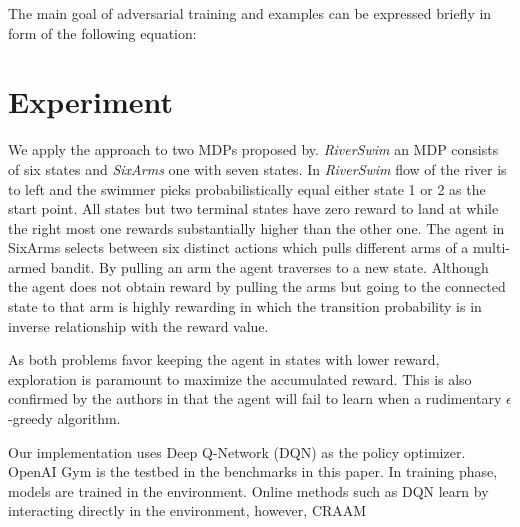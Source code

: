 \documentclass{article}
\begin{document}
    The main goal of adversarial training and examples can be expressed briefly in form of the following equation:


    \section{Experiment}
    We apply the approach to two MDPs proposed by\cite{Strehl2004}. \textit{RiverSwim} an MDP consists of six states and \textit{SixArms} one with seven states. In \textit{RiverSwim} flow of the river is to left and the swimmer picks probabilistically equal either state 1 or 2 as the start point. All states but two terminal states have zero reward to land at while the right most one rewards substantially higher than the other one. The agent in SixArms selects between six distinct actions which pulls different arms of a multi-armed bandit. By pulling an arm the agent traverses to a new state. Although the agent does not obtain reward by pulling the arms but going to the connected state to that arm is highly rewarding in which the transition probability is in inverse relationship with the reward value.

    As both problems favor keeping the agent in states with lower reward, exploration is paramount to maximize the accumulated reward. This is also confirmed by the authors in \cite{Strehl2004} that the agent will fail to learn when a rudimentary $\epsilon$-greedy algorithm.

    Our implementation uses Deep Q-Network (DQN)\cite{Mnih2015} as the policy optimizer. OpenAI Gym \cite{Brockman2016} is the testbed in the benchmarks in this paper. In training phase, models are trained in the environment. Online methods such as DQN learn by interacting directly in the environment, however, CRAAM

\end{document}
